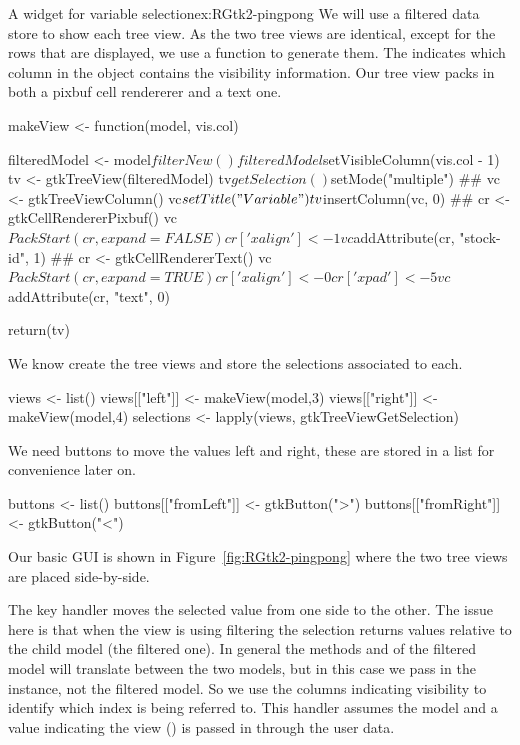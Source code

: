 \begin{example}{A widget for variable selection}{ex:RGtk2-pingpong}
We will use a filtered data store to show each tree view.
As the two tree views are identical, except for the rows that are
displayed, we use a function to generate them. The 
indicates which column in the  object contains the
visibility information. Our tree view packs in both a pixbuf cell
rendererer and a text one.
\begin{Schunk}
\begin{Sinput}
 makeView <- function(model, vis.col) {
   filteredModel <- model$filterNew()
   filteredModel$setVisibleColumn(vis.col - 1)
   tv <- gtkTreeView(filteredModel)
   tv$getSelection()$setMode("multiple")
   ##
   vc <- gtkTreeViewColumn()
   vc$setTitle("Variable")
   tv$insertColumn(vc, 0)
   ##
   cr <- gtkCellRendererPixbuf()
   vc$PackStart(cr, expand=FALSE)
   cr['xalign'] <- 1
   vc$addAttribute(cr, "stock-id", 1)
   ##
   cr <- gtkCellRendererText()
   vc$PackStart(cr, expand=TRUE)
   cr['xalign'] <- 0
   cr['xpad'] <- 5
   vc$addAttribute(cr, "text", 0)
 
   return(tv)
 }
\end{Sinput}
\end{Schunk}
We know create the tree views and store the selections associated to each.
\begin{Schunk}
\begin{Sinput}
 views <- list()
 views[["left"]] <- makeView(model,3)
 views[["right"]] <- makeView(model,4)
 selections <- lapply(views, gtkTreeViewGetSelection)
\end{Sinput}
\end{Schunk}
We need buttons to move the values left and right, these are stored
in a list for convenience later on.
\begin{Schunk}
\begin{Sinput}
 buttons <- list()
 buttons[["fromLeft"]] <- gtkButton(">")
 buttons[["fromRight"]] <- gtkButton("<")
\end{Sinput}
\end{Schunk}

Our basic GUI is shown in Figure~\ref{fig:RGtk2-pingpong} where the
two tree views are placed side-by-side.

The key handler moves the selected value from one side to the
other. The issue here is that when the view is using filtering the
selection returns values relative to the child model (the filtered
one). In general the methods  and
 of the filtered model will translate
between the two models, but in this case we pass in the
 instance, not the filtered model. So we use the
columns indicating visibility to identify which index is being
referred to. This handler assumes the model and a value indicating the
view () is passed in through the user data.
\begin{Schunk}
\end{Schunk}
\end{example}
